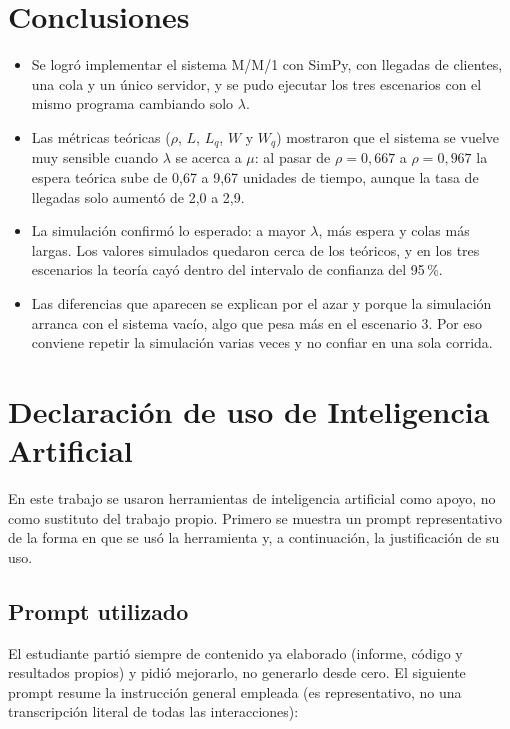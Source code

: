 \documentclass[11pt,a4paper]{article}
\begin{document}
\FloatBarrier
\section{Conclusiones}

\begin{itemize}
    \item Se logró implementar el sistema M/M/1 con SimPy, con llegadas de clientes,
    una cola y un único servidor, y se pudo ejecutar los tres escenarios con el mismo
    programa cambiando solo $\lambda$.
    \item Las métricas teóricas ($\rho$, $L$, $L_q$, $W$ y $W_q$) mostraron que el
    sistema se vuelve muy sensible cuando $\lambda$ se acerca a $\mu$: al pasar de
    $\rho = 0{,}667$ a $\rho = 0{,}967$ la espera teórica sube de 0,67 a 9,67 unidades
    de tiempo, aunque la tasa de llegadas solo aumentó de 2,0 a 2,9.
    \item La simulación confirmó lo esperado: a mayor $\lambda$, más espera y colas más
    largas. Los valores simulados quedaron cerca de los teóricos, y en los tres
    escenarios la teoría cayó dentro del intervalo de confianza del 95\,\%.
    \item Las diferencias que aparecen se explican por el azar y porque la simulación
    arranca con el sistema vacío, algo que pesa más en el escenario 3. Por eso conviene
    repetir la simulación varias veces y no confiar en una sola corrida.
\end{itemize}

\section{Declaración de uso de Inteligencia Artificial}

En este trabajo se usaron herramientas de inteligencia artificial como apoyo, no como
sustituto del trabajo propio. Primero se muestra un prompt representativo de la forma en
que se usó la herramienta y, a continuación, la justificación de su uso.

\subsection{Prompt utilizado}

El estudiante partió siempre de contenido ya elaborado (informe, código y resultados
propios) y pidió mejorarlo, no generarlo desde cero. El siguiente prompt resume la
instrucción general empleada (es representativo, no una transcripción literal de todas
las interacciones):
\end{document}

